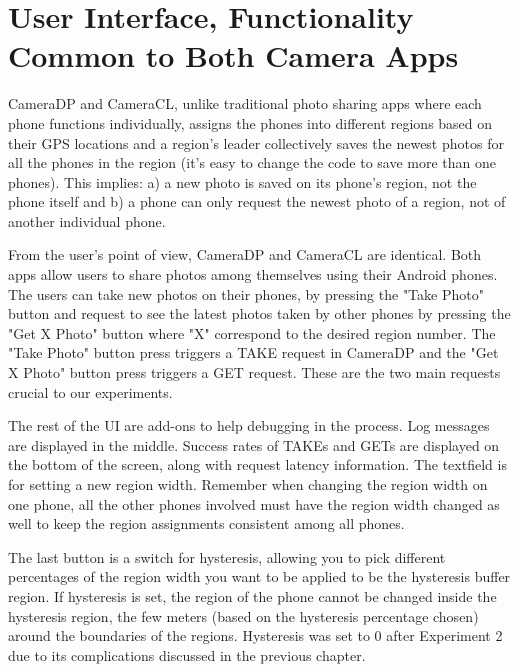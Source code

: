 \chapter{User Interface, Functionality Common to Both Camera Apps}

CameraDP and CameraCL, unlike traditional photo sharing apps where each phone functions individually, assigns the phones into different regions based on their GPS locations and a region's leader collectively saves the newest photos for all the phones in the region (it's easy to change the code to save more than one phones). This implies: a) a new photo is saved on its phone's region, not the phone itself and b) a phone can only request the newest photo of a region, not of another individual phone. 

From the user's point of view, CameraDP and CameraCL are identical. Both apps allow users to share photos among themselves using their Android phones.  The users can take new photos on their phones, by pressing the "Take Photo" button and request to see the latest photos taken by other phones by pressing the "Get X Photo" button where "X" correspond to the desired region number.  The "Take Photo" button press triggers a TAKE request in CameraDP and the "Get X Photo" button press triggers a GET request. These are the two main requests crucial to our experiments.

The rest of the UI are add-ons to help debugging in the process. Log messages are displayed in the middle. Success rates of TAKEs and GETs are displayed on the bottom of the screen, along with request latency information. The textfield is for setting a new region width. Remember when changing the region width on one phone, all the other phones involved must have the region width changed as well to keep the region assignments consistent among all phones. 

The last button is a switch for hysteresis, allowing you to pick different percentages of the region width you want to be applied to be the hysteresis buffer region. If hysteresis is set, the region of the phone cannot be changed inside the hysteresis region, the few meters (based on the hysteresis percentage chosen) around the boundaries of the regions. Hysteresis was set to 0 after Experiment 2 due to its complications discussed in the previous chapter.


